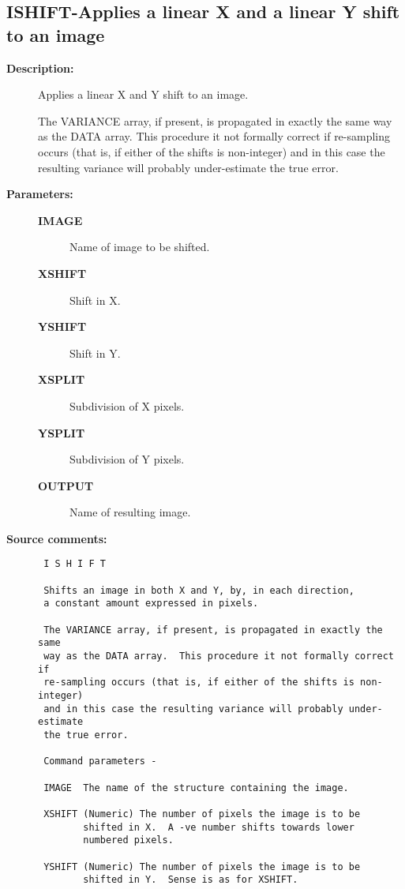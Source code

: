 \subsection{ISHIFT-\label{ISHIFT}Applies a linear X and a linear Y shift to an image}
\begin{description}

\item [{\bf Description:}]
 Applies a linear X and Y shift to an image.

 The VARIANCE array, if present, is propagated in exactly the same
 way as the DATA array.  This procedure it not formally correct if
 re-sampling occurs (that is, if either of the shifts is non-integer)
 and in this case the resulting variance will probably under-estimate
 the true error.

\item [{\bf Parameters:}]
\begin{description}
\item [{\bf IMAGE}]
 Name of image to be shifted.
\item [{\bf XSHIFT}]
 Shift in X.
\item [{\bf YSHIFT}]
 Shift in Y.
\item [{\bf XSPLIT}]
 Subdivision of X pixels.
\item [{\bf YSPLIT}]
 Subdivision of Y pixels.
\item [{\bf OUTPUT}]
 Name of resulting image.
\end{description}

\item [{\bf Source comments:}]
\begin{verbatim}
 I S H I F T

 Shifts an image in both X and Y, by, in each direction,
 a constant amount expressed in pixels.

 The VARIANCE array, if present, is propagated in exactly the same
 way as the DATA array.  This procedure it not formally correct if
 re-sampling occurs (that is, if either of the shifts is non-integer)
 and in this case the resulting variance will probably under-estimate
 the true error.

 Command parameters -

 IMAGE  The name of the structure containing the image.

 XSHIFT (Numeric) The number of pixels the image is to be
        shifted in X.  A -ve number shifts towards lower
        numbered pixels.

 YSHIFT (Numeric) The number of pixels the image is to be
        shifted in Y.  Sense is as for XSHIFT.


\end{verbatim}
\end{description}
